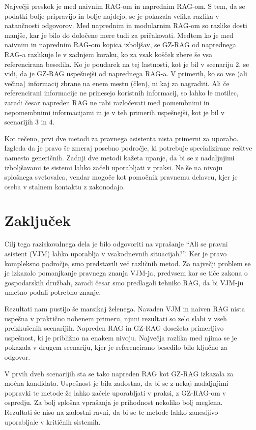 \documentclass[a4paper,12pt,openright]{book}
\begin{document}
Največji preskok je med naivnim RAG-om in naprednim RAG-om. S tem, da se podatki bolje pripravijo in bolje najdejo, se je pokazala velika razlika v natančnosti odgovorov. Med naprednim in modularnim RAG-om so razlike dosti manjše, kar je bilo do določene mere tudi za pričakovati. Medtem ko je med naivnim in naprednim RAG-om kopica izboljšav, se GZ-RAG od naprednega RAG-a razlikuje le v zadnjem koraku, ko za vsak košček zbere še vsa referencirana besedila. Ko je poudarek na tej lastnosti, kot je bil v scenariju 2, se vidi, da je GZ-RAG uspešnejši od naprednega RAG-a. V primerih, ko so vse (ali večina) informacij zbrane na enem mestu (člen), ni kaj za nagraditi. Ali če referencirani informacije ne prinesejo koristnih informacij, so lahko le motilec, zaradi česar napreden RAG ne rabi razločevati med pomembnimi in nepomembnimi informacijami in je v teh primerih uspešnejši, kot je bil v scenarijih 3 in 4.

Kot rečeno, prvi dve metodi za pravnega asistenta nista primerni za uporabo. Izgleda da je pravo še zmeraj posebno področje, ki potrebuje specializirane rešitve namesto generičnih. Zadnji dve metodi kažeta upanje, da bi se z nadaljnjimi izboljšavami te sistemi lahko začeli uporabljati v praksi. Ne še na nivoju splošnega svetovalca, vendar mogoče kot pomočnik pravnemu delavcu, kjer je oseba v stalnem kontaktu z zakonodajo.

\chapter{Zaključek}
\label{ch5}

Cilj tega raziskovalnega dela je bilo odgovoriti na vprašanje “Ali se pravni asistent (VJM) lahko uporablja v vsakodnevnih situacijah?”. Ker je pravo kompleksno področje, smo predstavili več različnih metod. Za največji problem se je izkazalo pomanjkanje pravnega znanja VJM-ja, predvsem kar se tiče zakona o gospodarskih družbah, zaradi česar smo predlagali tehniko RAG, da bi VJM-ju umetno podali potrebno znanje.

Rezultati nam pustijo še marsikaj želenega. Navaden VJM in naiven RAG nista uspešna v praktično nobenem primeru, njuni rezultati so zelo slabi v vseh preizkušenih scenarijih. Napreden RAG in GZ-RAG dosežeta primerljivo uspešnost, ki je približno na enakem nivoju. Največja razlika med njima se je pokazala v drugem scenariju, kjer je referencirano besedilo bilo ključno za odgovor.

V prvih dveh scenarijih sta se tako napreden RAG kot GZ-RAG izkazala za močna kandidata. Uspešnost je bila zadostna, da bi se z nekaj nadaljnjimi popravki te metode že lahko začele uporabljati v praksi, z GZ-RAG-om v ospredju. Za bolj splošna vprašanja je prihodnost nekoliko bolj meglena. Rezultati še niso na zadostni ravni, da bi se te metode lahko zanesljivo uporabljale v kritičnih sistemih.
\end{document}
